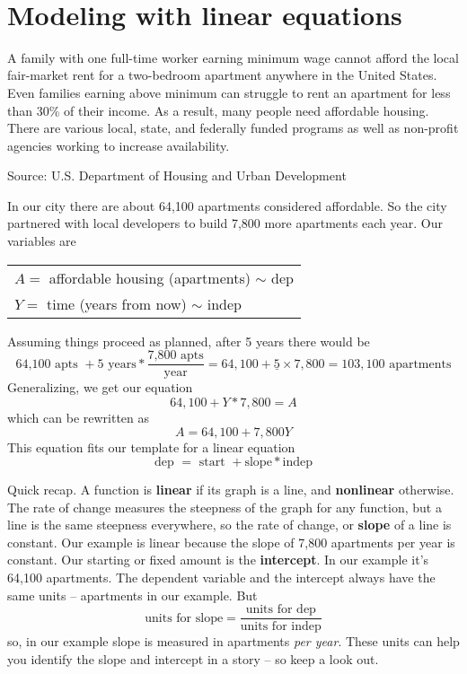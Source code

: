 ~\vspace{.1in}
 
\section{Modeling with linear equations}

A family with one full-time worker earning minimum wage cannot afford the local fair-market rent for a two-bedroom apartment anywhere in the United States.  
Even families earning above minimum can struggle to rent an apartment for less than 30\% of their income.  As a result, many people need affordable housing.  There are various local, state, and federally funded programs as well as non-profit agencies working to increase availability.

 \hfill \begin{footnotesize} Source:  U.S. Department of Housing and Urban Development \end{footnotesize} %

In our city there are about 64,100 apartments considered affordable.  So the city partnered with local developers to build 7,800 more apartments each year.    Our variables are
\begin{center}
\begin{tabular} {l} 
$A=$ affordable housing (apartments) $\sim$ dep \\
$Y=$ time (years from now) $\sim$ indep \\ 
\end{tabular}
\end{center}
Assuming things proceed as planned, after 5 years there would be 
$$\text{64,100 apts } + 5 \text{ years} \ast \frac{\text{7,800 apts}}{\text{year}}=64,100+\underline{5} \times 7,800 =  103,100 \text{ apartments}$$
Generalizing, we get our equation $$64,100+Y\ast 7,800 =  A$$
which can be rewritten as $$A = 64,100 + 7,800Y$$
This equation fits our template for a linear equation 
$$\text{dep }=\text{ start } + \text{slope} \ast {\text{indep}}$$

Quick recap.  A function is \textbf{linear} if its graph is a line, and \textbf{nonlinear} otherwise.  The rate of change measures the steepness of the graph for any function, but a line is the same steepness everywhere, so the rate of change, or \textbf{slope} of a line is constant.   Our example is linear because the slope of 7,800 apartments per year is constant.  Our starting or fixed amount is the \textbf{intercept}.  In our example it's  64,100 apartments.  The dependent variable and the intercept always have the same units -- apartments in our example.  But $$\text{units for slope} =\frac{\text{units for dep}}{\text{units for indep}}$$ so, in our example slope is measured in apartments \emph{per year}.
These units can help you identify the slope and intercept in a story -- so keep a look out.

